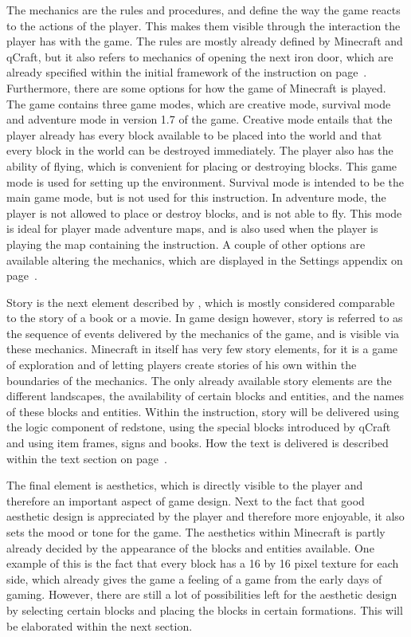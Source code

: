 \documentclass[11pt,twoside]{report} %
\begin{document}
The mechanics are the rules and procedures, and define the way the game reacts to the actions of the player. This makes them visible through the interaction the player has with the game. The rules are mostly already defined by Minecraft and qCraft, but it also refers to mechanics of opening the next iron door, which are already specified within the initial framework of the instruction on page~\pageref{app:framework1}. Furthermore, there are some options for how the game of Minecraft is played. The game contains three game modes, which are creative mode, survival mode and adventure mode in version 1.7 of the game. Creative mode entails that the player already has every block available to be placed into the world and that every block in the world can be destroyed immediately. The player also has the ability of flying, which is convenient for placing or destroying blocks. This game mode is used for setting up the environment. Survival mode is intended to be the main game mode, but is not used for this instruction. In adventure mode, the player is not allowed to place or destroy blocks, and is not able to fly. This mode is ideal for player made adventure maps, and is also used when the player is playing the map containing the instruction. A couple of other options are available altering the mechanics, which are displayed in the Settings appendix on page~\pageref{app:settings}.

Story is the next element described by , which is mostly considered comparable to the story of a book or a movie. In game design however, story is referred to as the sequence of events delivered by the mechanics of the game, and is visible via these mechanics. Minecraft in itself has very few story elements, for it is a game of exploration and of letting players create stories of his own within the boundaries of the mechanics. The only already available story elements are the different landscapes, the availability of certain blocks and entities, and the names of these blocks and entities. Within the instruction, story will be delivered using the logic component of redstone, using the special blocks introduced by qCraft and using item frames, signs and books. How the text is delivered is described within the text section on page~\pageref{subch:devtext}.

The final element is aesthetics, which is directly visible to the player and therefore an important aspect of game design. Next to the fact that good aesthetic design is appreciated by the player and therefore more enjoyable, it also sets the mood or tone for the game. The aesthetics within Minecraft is partly already decided by the appearance of the blocks and entities available. One example of this is the fact that every block has a 16 by 16 pixel texture for each side, which already gives the game a feeling of a game from the early days of gaming. However, there are still a lot of possibilities left for the aesthetic design by selecting certain blocks and placing the blocks in certain formations. This will be elaborated within the next section.
\end{document}
